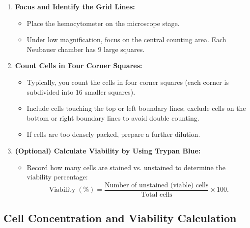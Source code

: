 \documentclass[11pt]{article}
\begin{document}
\begin{enumerate}[leftmargin=*]
    \item \textbf{Focus and Identify the Grid Lines:}
    \begin{itemize}[leftmargin=*]
        \item Place the hemocytometer on the microscope stage.
        \item Under low magnification, focus on the central counting area. Each Neubauer chamber has 9 large squares.
    \end{itemize}

    \item \textbf{Count Cells in Four Corner Squares:}
    \begin{itemize}[leftmargin=*]
        \item Typically, you count the cells in four corner squares (each corner is subdivided into 16 smaller squares).
        \item Include cells touching the top or left boundary lines; exclude cells on the bottom or right boundary lines to avoid double counting.
        \item If cells are too densely packed, prepare a further dilution.
    \end{itemize}

    \item \textbf{(Optional) Calculate Viability by Using Trypan Blue:}
    \begin{itemize}[leftmargin=*]
        \item Record how many cells are stained vs. unstained to determine the viability percentage:
        \[
            \text{Viability} \; (\%) = 
            \frac{\text{Number of unstained (viable) cells}}{\text{Total cells}} 
            \times 100.
        \]
    \end{itemize}
\end{enumerate}

\subsection{Cell Concentration and Viability Calculation}
\end{document}
